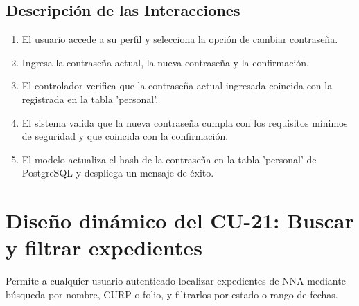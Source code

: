 \subsection{Descripción de las Interacciones}
\begin{enumerate}
    \item El usuario accede a su perfil y selecciona la opción de cambiar contraseña.
    \item Ingresa la contraseña actual, la nueva contraseña y la confirmación.
    \item El controlador verifica que la contraseña actual ingresada coincida con la registrada en la tabla 'personal'.
    \item El sistema valida que la nueva contraseña cumpla con los requisitos mínimos de seguridad y que coincida con la confirmación.
    \item El modelo actualiza el hash de la contraseña en la tabla 'personal' de PostgreSQL y despliega un mensaje de éxito.
\end{enumerate}

\cleardoublepage
\section{Diseño dinámico del CU-21: Buscar y filtrar expedientes}
\label{sec:disenoDinamicoCU21}

Permite a cualquier usuario autenticado localizar expedientes de NNA mediante búsqueda por nombre, CURP o folio, y filtrarlos por estado o rango de fechas.


